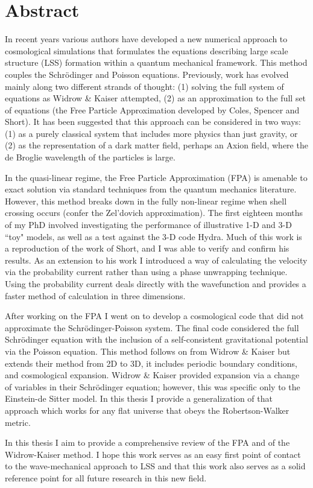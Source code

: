 \thispagestyle{empty}
\section*{Abstract}
In recent years various authors have developed a new numerical approach to cosmological simulations that formulates the equations describing large scale structure (LSS) formation within a quantum mechanical framework. This method couples the Schr\"odinger and Poisson equations. Previously, work has evolved mainly along two different strands of thought: (1) solving the full system of equations as Widrow \& Kaiser attempted, (2) as an approximation to the full set of equations (the Free Particle Approximation developed by Coles, Spencer and Short). It has been suggested that this approach can be considered in two ways: (1) as a purely classical system that includes more physics than just gravity, or (2) as the representation of a dark matter field, perhaps an Axion field, where the de Broglie wavelength of the particles is large.

In the quasi-linear regime, the Free Particle Approximation (FPA) is amenable to exact solution via standard techniques from the quantum mechanics literature. However, this method breaks down in the fully non-linear regime when shell crossing occurs (confer the Zel'dovich approximation). The first eighteen months of my PhD involved investigating the performance of illustrative 1-D and 3-D ``toy" models, as well as a test against the 3-D code Hydra. Much of this work is a reproduction of the work of Short, and I was able to verify and confirm his results. As an extension to his work I introduced a way of calculating the velocity via the probability current rather than using a phase unwrapping technique. Using the probability current deals directly with the wavefunction and provides a faster method of calculation in three dimensions.

After working on the FPA I went on to develop a cosmological code that did not approximate the Schr\"odinger-Poisson system. The final code considered the full Schr\"odinger equation with the inclusion of a self-consistent gravitational potential via the Poisson equation. This method follows on from Widrow \& Kaiser but extends their method from 2D to 3D, it includes periodic boundary conditions, and cosmological expansion. Widrow \& Kaiser provided expansion via a change of variables in their Schr\"odinger equation; however, this was specific only to the Einstein-de Sitter model. In this thesis I provide a generalization of that approach which works for any flat universe that obeys the Robertson-Walker metric.

In this thesis I aim to provide a comprehensive review of the FPA and of the Widrow-Kaiser method. I hope this work serves as an easy first point of contact to the wave-mechanical approach to LSS and that this work also serves as a solid reference point for all future research in this new field.
